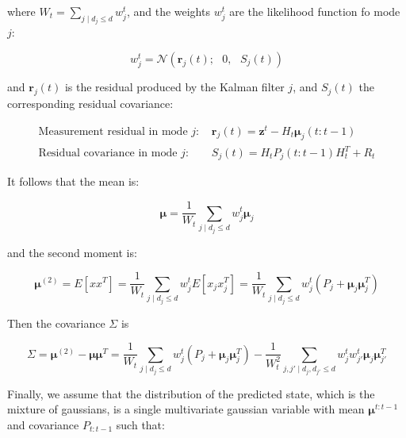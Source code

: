 \documentclass[11pt]{article}
\numberwithin{equation}{section}
\numberwithin{figure}{section}
\numberwithin{table}{section}
\begin{document}
\noindent where $W_{t}=\sum_{j\mid d_{j}\leq d}{w_{j}^{t}}$, and the weights $w_{j}^{t}$ are the likelihood function fo mode $j$:

\begin{equation}
w_{j}^{t} = \mathcal{N}(\boldsymbol r_{j}(t); \text{ }0, \text{ }S_{j}(t))
\label{eq:weightsMixture}
\end{equation}

\noindent and $\boldsymbol r_{j}(t)$ is the residual produced by the Kalman filter $j$, and $S_{j}(t)$ the corresponding residual covariance:

\begin{equation}
\begin{array}{ll}
\text{Measurement residual in mode $j$: } & \boldsymbol r_{j}(t) = \boldsymbol z^{t} - H_{t}\boldsymbol\mu_{j}(t:t-1)\\
\text{Residual covariance in mode $j$: } & S_{j}(t) = H_{t}P_{j}(t:t-1)H_{t}^{T}+R_{t}
\end{array}
\label{eq:weightsMixture2}
\end{equation}

\noindent It follows that the mean is:

\begin{equation}
\boldsymbol \mu = \frac{1}{W_{t}}\sum_{j\mid d_{j}\leq d}{w_{j}^{t}\boldsymbol\mu_{j}}
\label{eq:mixture3}
\end{equation}

\noindent and the second moment is:

\begin{equation}
\boldsymbol \mu^{(2)} = E\left[xx^{T}\right]= \frac{1}{W_{t}}\sum_{j\mid d_{j}\leq d}{w_{j}^{t}E\left[x_{j}x^{T}_{j}\right]} = \frac{1}{W_{t}}\sum_{j\mid d_{j}\leq d}{w_{j}^{t}\left(P_{j} + \boldsymbol\mu_{j} \boldsymbol\mu^{T}_{j}\right)}
\label{eq:mixture4}
\end{equation}

\noindent Then the covariance $\Sigma$ is

\begin{equation}
\Sigma = \boldsymbol\mu^{(2)} - \boldsymbol\mu \boldsymbol\mu^{T} = \frac{1}{W_{t}}\sum_{j\mid d_{j}\leq d}{w_{j}^{t}\left(P_{j} + \boldsymbol\mu_{j} \boldsymbol\mu^{T}_{j}\right)} - \frac{1}{W^{2}_{t}}\sum_{j,j'\mid d_{j},d_{j'}\leq d}{w_{j}^{t}w_{j'}^{t}\boldsymbol\mu_{j} \boldsymbol\mu^{T}_{j'}}
\label{eq:mixture5}
\end{equation}

Finally, we assume that the distribution of the predicted state, which is the mixture of gaussians, is a single multivariate gaussian variable with mean $\boldsymbol \mu^{t:t-1}$ and covariance $P_{t:t-1}$ such that:
\end{document}
